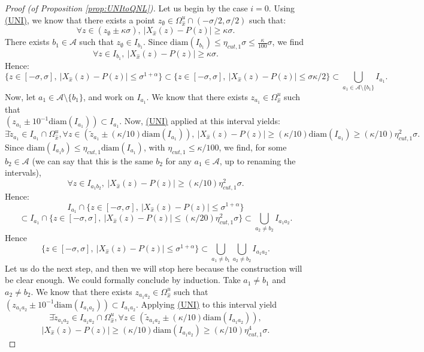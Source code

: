 \documentclass[a4paper]{article}
\theoremstyle{definition}
\begin{document}
\begin{proof}[Proof (of Proposition \ref{prop:UNItoQNL})]
Let us begin by the case $i=0$.
Using \hyperref[UNI]{(UNI)}, we know that there exists a point $z_{\emptyset} \in \Omega_{\widehat{x}}^u \cap(-\sigma/2,\sigma/2)$ such that:
$$ \forall z \in (z_{\emptyset} \pm \kappa\sigma), \ |X_{\widehat{x}}(z)-P(z)| \geq \kappa \sigma.$$
There exists $b_1 \in \mathcal{A}$ such that $z_{\emptyset} \in I_{b_1}$. Since $\text{diam}(I_{b_1}) \leq \eta_{cut,1} \sigma \leq \frac{\kappa}{100} \sigma$, we find 
$$ \forall z \in I_{b_1}, \ |X_{\widehat{x}}(z)-P(z)| \geq \kappa \sigma.$$
Hence: $$ \{ z \in [-\sigma,\sigma] , \ |X_{\widehat{x}}(z)-P(z)| \leq \sigma^{1+\alpha} \} \subset \{ z \in [-\sigma,\sigma] , \ |X_{\widehat{x}}(z)-P(z)| \leq \sigma \kappa/2 \} \subset \bigcup_{a_1 \in \mathcal{A}\setminus \{b_1\}} I_{a_1}.$$
Now, let $a_1 \in \mathcal{A} \setminus \{b_1\}$, and work on $I_{a_1}$. We know that there exists $z_{a_1} \in \Omega_{\widehat{x}}^u$ such that \\$(z_{a_1} \pm 10^{-1} \text{diam}(I_{a_1})) \subset I_{a_1}$. Now, \hyperref[UNI]{(UNI)} applied at this interval yields:
$$ \exists \tilde{z}_{a_1} \in I_{a_1} \cap \Omega_{\widehat{x}}^u, \forall z \in (\tilde{z}_{a_1} \pm (\kappa/10) \text{diam}(I_{a_1})), \ |X_{\widehat{x}}(z) - P(z)| \geq (\kappa/10) \text{diam}(I_{a_1}) \geq (\kappa/10) \eta_{cut,1}^2 \sigma. $$
Since $\text{diam}(I_{a_1 b}) \leq \eta_{cut,1} \text{diam}(I_{a_1})$, with $\eta_{cut,1} \leq \kappa/100$, we find, for some $b_2 \in \mathcal{A}$ (we can say that this is the same $b_2$ for any $a_1 \in \mathcal{A}$, up to renaming the intervals),
$$ \forall z \in I_{a_1 b_2}, \ |X_{\widehat{x}}(z) - P(z)| \geq (\kappa / 10) \eta_{cut,1}^2 \sigma. $$
Hence:
$$ I_{a_1} \cap \{ z \in [-\sigma,\sigma] , \ |X_{\widehat{x}}(z) - P(z)| \leq \sigma^{1+\alpha} \} $$ $$\subset I_{a_1} \cap \{ z \in [-\sigma,\sigma] , \ |X_{\widehat{x}}(z) - P(z)| \leq (\kappa/20) {\eta_{cut,1}^2} \sigma \} \subset \bigcup_{a_2 \neq b_2} I_{a_1 a_2}. $$
Hence $$ \{ z \in [-\sigma,\sigma] , \ |X_{\widehat{x}}(z) - P(z)| \leq \sigma^{1+\alpha} \}  \subset \bigcup_{a_1 \neq b_1} \bigcup_{a_2 \neq b_2} I_{a_1 a_2} . $$
Let us do the next step, and then we will stop here because the construction will be clear enough. We could formally conclude by induction.
Take $a_1 \neq b_1$ and $a_2 \neq b_2$. We know that there exists $z_{a_1 a_2} \in \Omega_{\widehat{x}}^u$ such that $(z_{a_1 a_2} \pm 10^{-1} \text{diam}(I_{a_1 a_2})) \subset I_{a_1 a_2}$.  Applying \hyperref[UNI]{(UNI)} to this interval yield
$$ \exists \tilde{z}_{a_1 a_2} \in I_{a_1 a_2} \cap \Omega_{\widehat{x}}^u, \forall z \in (\tilde{z}_{a_1 a_2} \pm (\kappa/10) \text{diam}(I_{a_1 a_2})), $$ $$ |X_{\widehat{x}}(z)-P(z)| \geq (\kappa/10) \text{diam}(I_{a_1 a_2}) \geq (\kappa/10) \eta_{cut,1}^4 \sigma.$$

\end{proof}
\end{document}
